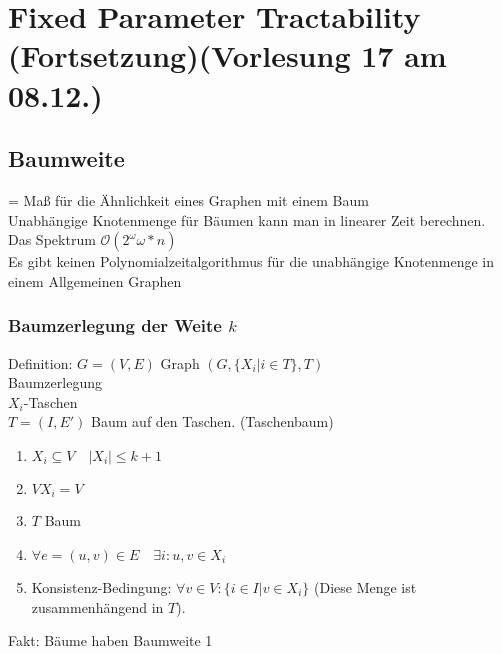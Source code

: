 \section{ Fixed Parameter Tractability (Fortsetzung)\tiny (Vorlesung 17 am 08.12.)}

\subsection*{Baumweite}
= Maß für die Ähnlichkeit eines Graphen mit einem Baum\\


Unabhängige Knotenmenge für Bäumen kann man in linearer Zeit berechnen.\\
Das Spektrum $\mathcal{O}(2^\omega \omega * n)$\\
Es gibt keinen Polynomialzeitalgorithmus für die unabhängige Knotenmenge in einem Allgemeinen Graphen\\

\subsubsection*{Baumzerlegung der Weite $k$}
Definition: $G=(V,E)$ Graph $( G, \{ X_i | i \in T \}, T )$\\
Baumzerlegung\\
$X_i$-Taschen\\
$T = (I,E')$ Baum auf den Taschen. (Taschenbaum)\\

\begin{enumerate}
\item $X_i \subseteq V \quad |X_i| \leq k +1 $
\item $VX_i = V$
\item $T $ Baum
\item $\forall e = (u,v) \in E \quad	 \exists i: u,v \in X_i$
\item Konsistenz-Bedingung: $\forall v \in V : \{ i \in I | v \in X_i\}$ (Diese Menge ist zusammenhängend in $T$). 
\end{enumerate}


Fakt: Bäume haben Baumweite 1\\


